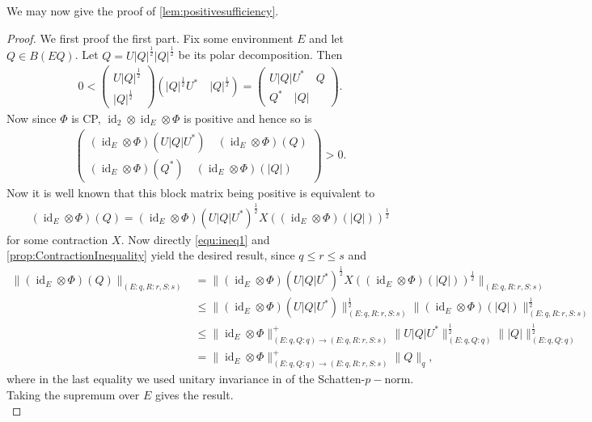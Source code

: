 \documentclass[11pt]{article}
\DeclareMathOperator{\id}{id}
\newcommand{\1}{\ensuremath{\mathbbm{1}}}
\theoremstyle{newdefinition}
\theoremstyle{newplain}
\theoremstyle{myplain}
\begin{document}
We may now give the proof of \cref{lem:positivesufficiency}.
\begin{proof}
We first proof the first part. 
Fix some environment $E$ and let $Q\in B(EQ)$. Let $Q=U|Q|^{\frac{1}{2}}|Q|^{\frac{1}{2}}$ be its polar decomposition. Then
\begin{align}
   0 < \begin{pmatrix}
    U|Q|^{\frac{1}{2}} \\
    |Q|^{\frac{1}{2}}
    \end{pmatrix} (|Q|^{\frac{1}{2}}U^* \quad |Q|^{\frac{1}{2}}) = \begin{pmatrix}
        U|Q|U^* \quad Q \\
        Q^* \quad |Q|
    \end{pmatrix}.
\end{align}
Now since $\Phi$ is CP, $\id_2\otimes\id_E\otimes\Phi$ is positive and hence so is
\begin{align}
    \begin{pmatrix}
        (\id_E\otimes\Phi)(U|Q|U^*) \quad (\id_E\otimes\Phi)(Q) \\
        (\id_E\otimes\Phi)(Q^*) \quad (\id_E\otimes\Phi)(|Q|)
    \end{pmatrix} >0.
\end{align}
Now it is well known \cite{Book.Hiai.2014} that this block matrix being positive is equivalent to 
\begin{align}
\label{equ:ineq1}
    (\id_E\otimes\Phi)(Q) = (\id_E\otimes\Phi)(U|Q|U^*)^{\frac{1}{2}}X((\id_E\otimes\Phi)(|Q|))^{\frac{1}{2}}
\end{align}
for some contraction $X$. Now directly \eqref{equ:ineq1} and \cref{prop:ContractionInequality} yield the desired result, since $q\leq r\leq s$ and
\begin{align}
  \|(\id_E\otimes\Phi)(Q) \|_{(E:q,R:r,S:s)} &=  \|(\id_E\otimes\Phi)(U|Q|U^*)^{\frac{1}{2}}X((\id_E\otimes\Phi)(|Q|))^{\frac{1}{2}}\|_{(E:q,R:r,S:s)} \\ &\leq \|(\id_E\otimes\Phi)(U|Q|U^*)\|^{\frac{1}{2}}_{(E:q,R:r,S:s)}\|(\id_E\otimes\Phi)(|Q|)\|^{\frac{1}{2}}_{(E:q,R:r,S:s)} \\ 
  &\leq \|\id_E\otimes\Phi\|^+_{(E:q,Q:q)\to (E:q,R:r,S:s)} \|U|Q|U^*\|^{\frac{1}{2}}_{(E:q,Q:q)}\||Q|\|^{\frac{1}{2}}_{(E:q,Q:q)}
  \\ &=  \|\id_E\otimes\Phi\|^+_{(E:q,Q:q)\to (E:q,R:r,S:s)}\|Q\|_{q},
\end{align} where in the last equality we used unitary invariance in of the Schatten-$p-$norm. Taking the supremum over $E$ gives the result. \\

\end{proof}
\end{document}
